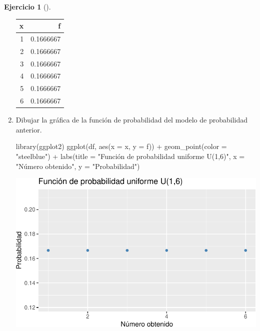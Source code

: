 \documentclass[
  a4paper,
]{scrreport}
\newenvironment{Shaded}{\begin{snugshade}}{\end{snugshade}}
\newcommand{\AttributeTok}[1]{\textcolor[rgb]{0.40,0.45,0.13}{#1}}
\newcommand{\FunctionTok}[1]{\textcolor[rgb]{0.28,0.35,0.67}{#1}}
\newcommand{\NormalTok}[1]{\textcolor[rgb]{0.00,0.23,0.31}{#1}}
\newcommand{\SpecialCharTok}[1]{\textcolor[rgb]{0.37,0.37,0.37}{#1}}
\newcommand{\StringTok}[1]{\textcolor[rgb]{0.13,0.47,0.30}{#1}}
\theoremstyle{definition}
\newtheorem{exercise}{Ejercicio}[chapter]
\theoremstyle{remark}
\begin{document}
\begin{exercise}[]
\begin{enumerate}
\begin{tcolorbox}
  \begin{table}
  \centering
  \begin{tabular}{r|r}
  \hline
  x & f\\
  \hline
  1 & 0.1666667\\
  \hline
  2 & 0.1666667\\
  \hline
  3 & 0.1666667\\
  \hline
  4 & 0.1666667\\
  \hline
  5 & 0.1666667\\
  \hline
  6 & 0.1666667\\
  \hline
  \end{tabular}
  \end{table}

  \end{tcolorbox}
\item
  Dibujar la gráfica de la función de probabilidad del modelo de
  probabilidad anterior.

  \begin{tcolorbox}[enhanced jigsaw, toprule=.15mm, rightrule=.15mm, arc=.35mm, colback=white, colbacktitle=quarto-callout-tip-color!10!white, toptitle=1mm, left=2mm, colframe=quarto-callout-tip-color-frame, opacityback=0, breakable, opacitybacktitle=0.6, bottomtitle=1mm, titlerule=0mm, title=\textcolor{quarto-callout-tip-color}{\faLightbulb}\hspace{0.5em}{Solución}, bottomrule=.15mm, coltitle=black, leftrule=.75mm]

\begin{Shaded}
\begin{Highlighting}[]
\FunctionTok{library}\NormalTok{(ggplot2)}
\FunctionTok{ggplot}\NormalTok{(df, }\FunctionTok{aes}\NormalTok{(}\AttributeTok{x =}\NormalTok{ x, }\AttributeTok{y =}\NormalTok{ f)) }\SpecialCharTok{+}
    \FunctionTok{geom\_point}\NormalTok{(}\AttributeTok{color =} \StringTok{"steelblue"}\NormalTok{) }\SpecialCharTok{+}
    \FunctionTok{labs}\NormalTok{(}\AttributeTok{title =} \StringTok{"Función de probabilidad uniforme U(1,6)"}\NormalTok{, }\AttributeTok{x =} \StringTok{"Número obtenido"}\NormalTok{, }\AttributeTok{y =} \StringTok{"Probabilidad"}\NormalTok{)}
\end{Highlighting}
\end{Shaded}

  \includegraphics{06-distribuciones-probabilidad_files/figure-pdf/unnamed-chunk-2-1.pdf}


\end{tcolorbox}
\end{enumerate}
\end{exercise}
\end{document}
